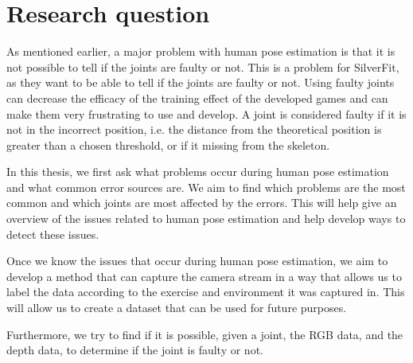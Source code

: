 \section{Research question}

As mentioned earlier, a major problem with human pose estimation is that it is not possible to tell if the joints are faulty or not. This is a problem for SilverFit, as they want to be able to tell if the joints are faulty or not. Using faulty joints can decrease the efficacy of the training effect of the developed games and can make them very frustrating to use and develop. A joint is considered faulty if it is not in the incorrect position, i.e. the distance from the theoretical position is greater than a chosen threshold, or if it missing from the skeleton.

In this thesis, we first ask what problems occur during human pose estimation and what common error sources are. We aim to find which problems are the most common and which joints are most affected by the errors. This will help give an overview of the issues related to human pose estimation and help develop ways to detect these issues. 

Once we know the issues that occur during human pose estimation, we aim to develop a method that can capture the camera stream in a way that allows us to label the data according to the exercise and environment it was captured in. This will allow us to create a dataset that can be used for future purposes.

Furthermore, we try to find if it is possible, given a joint, the RGB data, and the depth data, to determine if the joint is faulty or not.



